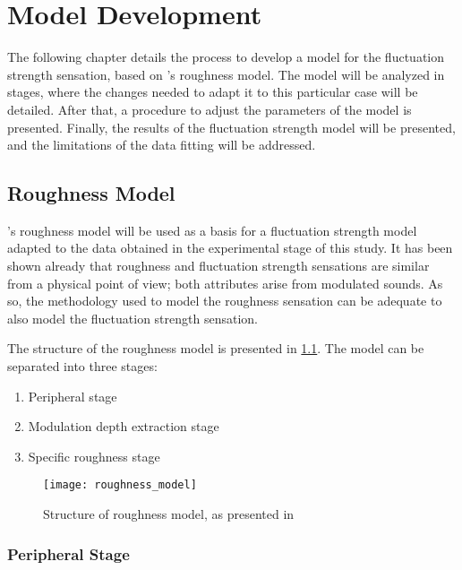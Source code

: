 \documentclass[../main.tex]{subfiles}
\begin{document}
\chapter{Model Development}

\begin{modelchapter}

The following chapter details the process to develop a model for the fluctuation
strength sensation, based on \citeauthor{daniel1997psychoacoustical}'s roughness
model. The model will be analyzed in stages, where the changes needed to adapt
it to this particular case will be detailed. After that, a procedure to adjust
the parameters of the model is presented. Finally, the results of the
fluctuation strength model will be presented, and the limitations of the data
fitting will be addressed.

\section{Roughness Model}

\citeauthor{daniel1997psychoacoustical}'s roughness model will be used as a
basis for a fluctuation strength model adapted to the data obtained in the
experimental stage of this study. It has been shown already that roughness and
fluctuation strength sensations are similar from a physical point of view; both
attributes arise from modulated sounds. As so, the methodology used to model
the roughness sensation can be adequate to also model the fluctuation strength
sensation.

The structure of the roughness model is presented in \cref{fig:roughness_model}.
The model can be separated into three stages:
\begin{enumerate}
  \item Peripheral stage
  \item Modulation depth extraction stage
  \item Specific roughness stage
\end{enumerate}

\begin{figure}[!ht]
  \centering
  \texttt{[image: roughness\_model]}
  \caption{Structure of roughness model, as presented in
    \cite[pp.~116]{daniel1997psychoacoustical}}
  \label{fig:roughness_model}
\end{figure}

\subsection{Peripheral Stage}


\end{modelchapter}
\end{document}

